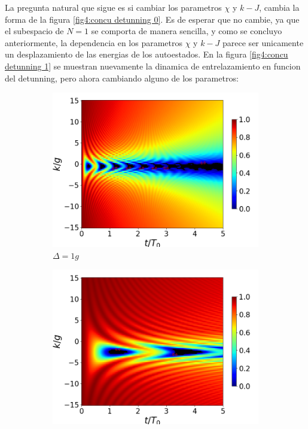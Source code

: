 La pregunta natural que sigue es si cambiar los parametros $\chi$ y $k-J$, cambia la forma de la figura \ref{fig4:concu detunning 0}. Es de esperar que no cambie, ya que el subespacio de $N=1$ se comporta de manera sencilla, y como se concluyo anteriormente, la dependencia en los parametros $\chi$ y $k-J$ parece ser unicamente un desplazamiento de las energias de los autoestados. En la figura \ref{fig4:concu detunning 1} se muestran nuevamente la dinamica de entrelazamiento en funcion del detunning, pero ahora cambiando alguno de los parametros:

\begin{figure}[h]
    \centering
    \begin{subfigure}{0.49\textwidth}
        \includegraphics[width=\textwidth]{figuras/ch4/concu/k/eg0+ge0 d=1.0g x=0.0g J=15.0g gamma=0.25g concu k dis.png}
        \caption{$\Delta=1g$}
        \label{fig4:concu k d1}
    \end{subfigure}
    \hfill
    \begin{subfigure}{0.49\textwidth}
        \includegraphics[width=\textwidth]{figuras/ch4/concu/k/eg0+ge0 d=5.0g x=0.0g J=15.0g gamma=0.25g concu k dis.png}

\end{subfigure}
\end{figure}
